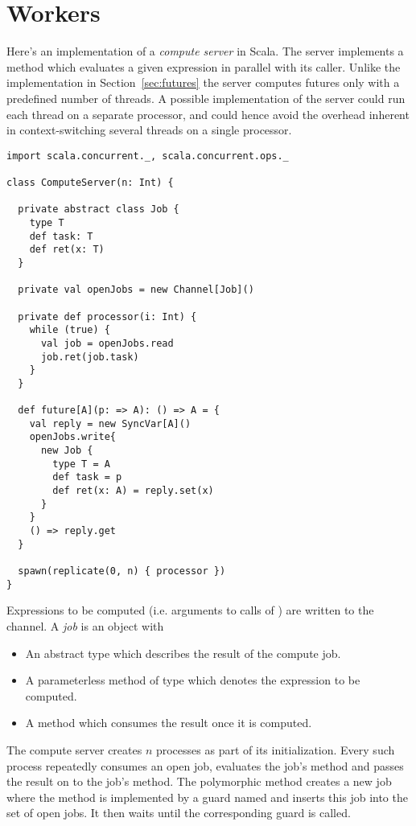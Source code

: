 \section{Workers}

Here's an implementation of a {\em compute server} in Scala. The
server implements a  method which evaluates a given
expression in parallel with its caller. Unlike the implementation in
Section~\ref{sec:futures} the server computes futures only with a
predefined number of threads. A possible implementation of the server
could run each thread on a separate processor, and could hence avoid
the overhead inherent in context-switching several threads on a single
processor.

\begin{lstlisting}
import scala.concurrent._, scala.concurrent.ops._

class ComputeServer(n: Int) {

  private abstract class Job {
    type T
    def task: T
    def ret(x: T)
  }

  private val openJobs = new Channel[Job]()

  private def processor(i: Int) {
    while (true) {
      val job = openJobs.read
      job.ret(job.task)
    }
  }

  def future[A](p: => A): () => A = {
    val reply = new SyncVar[A]()
    openJobs.write{
      new Job {
        type T = A
        def task = p
        def ret(x: A) = reply.set(x)
      }
    }
    () => reply.get
  }

  spawn(replicate(0, n) { processor })
}
\end{lstlisting}
Expressions to be computed (i.e. arguments
to calls of ) are written to the 
channel. A {\em job} is an object with
\begin{itemize}
\item
An abstract type  which describes the result of the compute
job.
\item
A parameterless  method of type  which denotes
the expression to be computed.
\item
A  method which consumes the result once it is
computed.
\end{itemize}
The compute server creates $n$  processes as part of
its initialization.  Every such process repeatedly consumes an open
job, evaluates the job's  method and passes the result on
to the job's
 method. The polymorphic  method creates
a new job where the  method is implemented by a guard
named  and inserts this job into the set of open jobs. 
It then waits until the corresponding
 guard is called.

